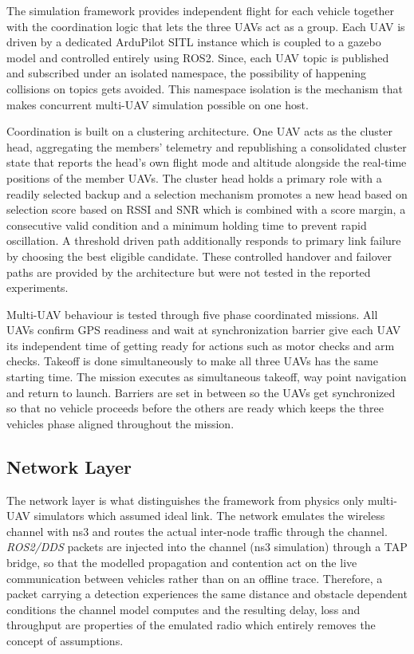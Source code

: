 The simulation framework provides independent flight for each vehicle together with the coordination logic that lets the three UAVs act as a group. Each UAV is driven by a dedicated ArduPilot SITL instance which is coupled to a gazebo model and controlled entirely using ROS2. Since, each UAV topic is published and subscribed under an isolated namespace, the possibility of happening collisions on topics gets avoided. This namespace isolation is the mechanism that makes concurrent multi-UAV simulation possible on one host.

Coordination is built on a clustering architecture. One UAV acts as the cluster head, aggregating the members' telemetry and republishing a consolidated cluster state that reports the head's own flight mode and altitude alongside the real-time positions of the member UAVs. The cluster head holds a primary role with a readily selected backup and a selection mechanism promotes a new head based on selection score based on RSSI and SNR which is combined with a score margin, a consecutive valid condition and a minimum holding time to prevent rapid oscillation. A threshold driven path additionally responds to primary link failure by choosing the best eligible candidate. These controlled handover and failover paths are provided by the architecture but were not tested in the reported experiments.

Multi-UAV behaviour is tested through five phase coordinated missions. All UAVs confirm GPS readiness and wait at synchronization barrier give each UAV its independent time of getting ready for actions such as motor checks and arm checks. Takeoff is done simultaneously to make all three UAVs has the same starting time. The mission executes as simultaneous takeoff, way point navigation and return to launch. Barriers are set in between so the UAVs get synchronized so that no vehicle proceeds before the others are ready which keeps the three vehicles phase aligned throughout the mission.


\subsection{Network Layer}

The network layer is what distinguishes the framework from physics only multi-UAV simulators which assumed ideal link. The network emulates the wireless channel with ns3 and routes the actual inter-node traffic through the channel. \emph{ROS2/DDS} packets are injected into the channel (ns3 simulation) through a TAP bridge, so that the modelled propagation and contention act on the live communication between vehicles rather than on an offline trace. Therefore, a packet carrying a detection experiences the same distance and obstacle dependent conditions the channel model computes and the resulting delay, loss and throughput are properties of the emulated radio which entirely removes the concept of assumptions.

